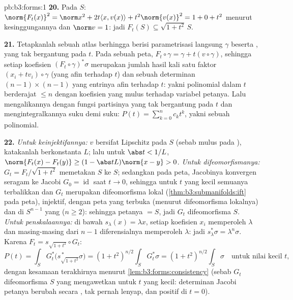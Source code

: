 \begin{solution}{pb:b3:forms:1}
\textbf{20.} Pada $S$: $\norm{F_t(x)}^2 = \norm x^2 +
2t\langle x, v(x)\rangle + t^2\norm{v(x)}^2 = 1 + 0 + t^2$
menurut kesinggungannya dan $\norm v = 1$: jadi $F_t(S) \subseteq
\sqrt{1+t^2}\,S$.

\textbf{21.} Tetapkanlah sebuah atlas berhingga berisi parametrisasi
langsung $\gamma$ beserta , yang tak bergantung pada $t$. Pada sebuah
peta, $F_t\circ\gamma = \gamma + t(v\circ\gamma)$, sehingga setiap
koefisien $(F_t\circ\gamma)^*\sigma$ merupakan jumlah
hasil kali satu faktor $(x_i + tv_i)\circ\gamma$ (yang afin terhadap
$t$) dan sebuah determinan $(n-1)\times(n-1)$ yang entrinya
afin terhadap $t$: yakni polinomial dalam $t$ berderajat $\leq n$ dengan
koefisien yang mulus terhadap variabel petanya. Lalu mengalikannya dengan
fungsi partisinya yang tak bergantung pada $t$ dan mengintegralkannya
suku demi suku: $P(t) = \sum_{k=0}^n c_kt^k$, yakni sebuah polinomial.

\textbf{22.} \emph{Untuk keinjektifannya:} $v$ bersifat Lipschitz pada $S$
(sebab mulus pada ), katakanlah berkonstanta $L$; lalu untuk $\abs t <
1/L$, $\norm{F_t(x) - F_t(y)} \geq (1 - \abs
tL)\norm{x - y} > 0$. \emph{Untuk difeomorfismanya:} $G_t =
F_t/\sqrt{1 + t^2}$ memetakan $S$ ke $S$; sedangkan pada peta, Jacobinya
konvergen seragam ke Jacobi $G_0 = \operatorname{id}$ saat
$t \to 0$, sehingga untuk $t$ yang kecil semuanya terbalikkan dan $G_t$ merupakan
difeomorfisma lokal (\cref{thm:b3:submanifolds:ift} pada
peta), injektif, dengan peta yang terbuka (menurut difeomorfisma lokalnya) dan
 di $S^{n-1}$ yang \emph{} ($n \geq 2$):
sehingga petanya $= S$, jadi $G_t$ difeomorfisma $S$.
\emph{Untuk penskalaannya:} di bawah $s_\lambda(x) = \lambda x$, setiap
koefisien $x_i$ memperoleh $\lambda$ dan masing-masing dari $n - 1$
diferensialnya memperoleh $\lambda$: jadi $s_\lambda^*\sigma =
\lambda^n\sigma$. Karena $F_t = s_{\sqrt{1+t^2}}\circ G_t$:
\[
P(t) = \int_SG_t^*\bigl(s_{\sqrt{1+t^2}}^{\,*}\sigma\bigr)
= (1 + t^2)^{n/2}\int_SG_t^*\sigma
= (1 + t^2)^{n/2}\int_S\sigma
\quad\text{untuk nilai kecil } t,
\]
dengan kesamaan terakhirnya menurut \cref{lem:b3:forms:consistency} (sebab $G_t$
difeomorfisma $S$ yang mengawetkan  untuk $t$ yang
kecil: determinan Jacobi petanya berubah secara ,
tak pernah lenyap, dan positif di $t = 0$).


\end{solution}
